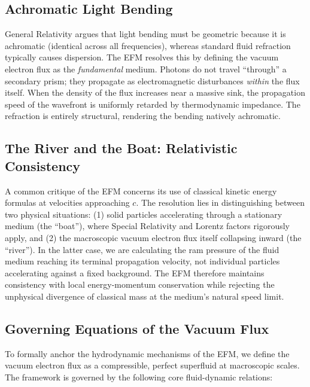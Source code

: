 \documentclass[11pt, a4paper]{article}
\begin{document}
\subsection{Achromatic Light Bending}
General Relativity argues that light bending must be geometric because it is achromatic (identical across all frequencies), whereas standard fluid refraction typically causes dispersion. The EFM resolves this by defining the vacuum electron flux as the \textit{fundamental} medium. Photons do not travel ``through'' a secondary prism; they propagate as electromagnetic disturbances \textit{within} the flux itself. When the density of the flux increases near a massive sink, the propagation speed of the wavefront is uniformly retarded by thermodynamic impedance. The refraction is entirely structural, rendering the bending natively achromatic.

\subsection{The River and the Boat: Relativistic Consistency}
A common critique of the EFM concerns its use of classical kinetic energy formulas at velocities approaching $c$. The resolution lies in distinguishing between two physical situations: (1) solid particles accelerating through a stationary medium (the ``boat''), where Special Relativity and Lorentz factors rigorously apply, and (2) the macroscopic vacuum electron flux itself collapsing inward (the ``river''). In the latter case, we are calculating the ram pressure of the fluid medium reaching its terminal propagation velocity, not individual particles accelerating against a fixed background. The EFM therefore maintains consistency with local energy-momentum conservation while rejecting the unphysical divergence of classical mass at the medium's natural speed limit.

\subsection{Governing Equations of the Vacuum Flux}
To formally anchor the hydrodynamic mechanisms of the EFM, we define the vacuum electron flux as a compressible, perfect superfluid at macroscopic scales. The framework is governed by the following core fluid-dynamic relations:
\end{document}
